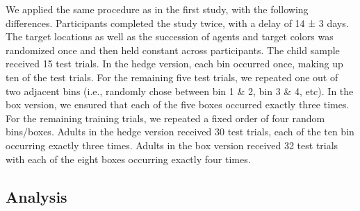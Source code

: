 \documentclass[
  man,floatsintext]{apa6}
\begin{document}
We applied the same procedure as in the first study, with the following differences. Participants completed the study twice, with a delay of 14 ± 3 days.
The target locations as well as the succession of agents and target colors was randomized once and then held constant across participants.
The child sample received 15 test trials. In the hedge version, each bin occurred once, making up ten of the test trials. For the remaining five test trials, we repeated one out of two adjacent bins (i.e., randomly chose between bin 1 \& 2, bin 3 \& 4, etc). In the box version, we ensured that each of the five boxes occurred exactly three times. For the remaining training trials, we repeated a fixed order of four random bins/boxes.
Adults in the hedge version received 30 test trials, each of the ten bin occurring exactly three times. Adults in the box version received 32 test trials with each of the eight boxes occurring exactly four times.

\hypertarget{analysis-1}{%
\subsection{Analysis}\label{analysis-1}}
\end{document}
